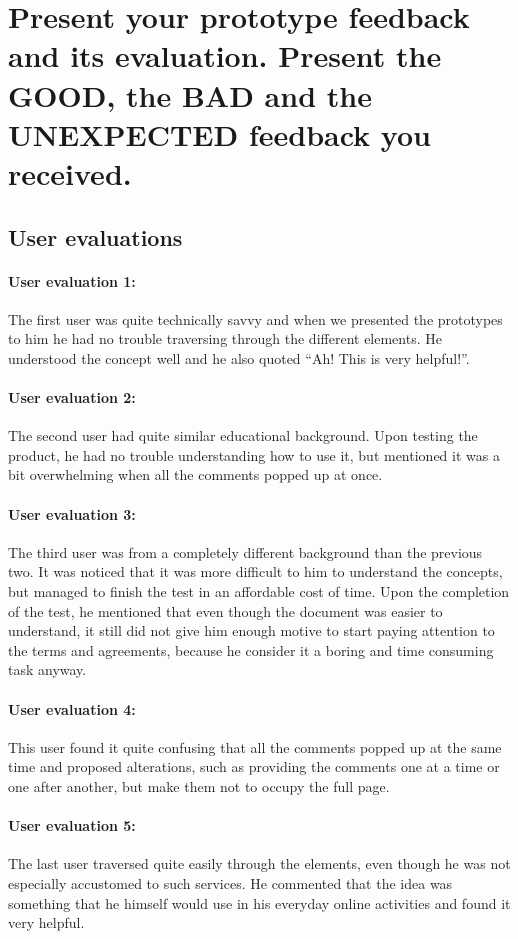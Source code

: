 \section{Present your prototype feedback and its evaluation. Present the GOOD, 
the BAD and the UNEXPECTED feedback you received.}
\label{s_7}

\subsection{User evaluations}

\paragraph{User evaluation 1: }
The first user was quite technically savvy and when we presented the prototypes 
to him he had no trouble traversing through the different elements. He 
understood the concept well and he also quoted ``Ah! This is very helpful!''.
\paragraph{User evaluation 2: }
The second user had quite similar educational background. Upon testing the 
product, he had no trouble understanding how to use it, but mentioned it was a 
bit overwhelming when all the comments popped up at once.
\paragraph{User evaluation 3: }
The third user was from a completely different background than the previous two. 
It was noticed that it was more difficult to him to understand the concepts, but 
managed to finish the test in an affordable cost of time. Upon the completion of 
the test, he mentioned that even though the document was easier to understand, 
it still did not give him enough motive to start paying attention to the terms 
and agreements, because he consider it a boring and time consuming task anyway.
\paragraph{User evaluation 4: }
This user found it quite confusing that all the comments popped up at the same 
time and proposed alterations, such as providing the comments one at a time or 
one after another, but make them not to occupy the full page.
\paragraph{User evaluation 5: }
The last user traversed quite easily through the elements, even though he was 
not especially accustomed to such services. He commented that the idea was 
something that he himself would use in his everyday online activities and found 
it very helpful.


